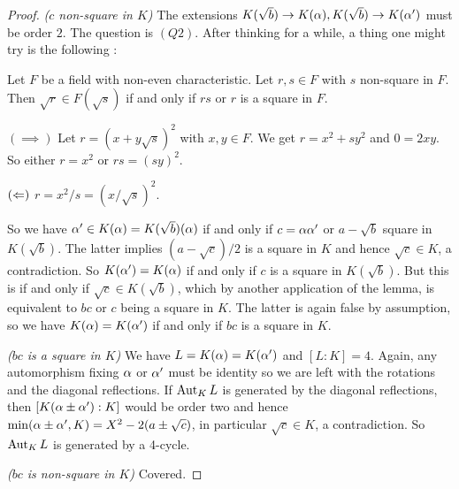 \documentclass{article}
\begin{document}
\begin{proof}
  \textit{($c$ non-square in $K$)}
  The extensions $K(\sqrt{b}) \to K(\alpha), K(\sqrt{b}) \to K(\alpha')$ must 
  be order $2$.
  The question is $(Q2)$.
  After thinking for a while, 
  a thing one might try is the following : 
  \begin{lem}
    Let $F$ be a field with non-even characteristic.
    Let $r,s \in F$ with $s$ non-square in $F$.
    Then $\sqrt{r} \in F(\sqrt{s})$ if and only if 
    $rs$ or $r$ is a square in $F$.
    \begin{proof1}
      $(\implies)$
      Let $r = (x + y\sqrt{s})^2$ with $x,y \in F$.
      We get $r = x^2 + sy^2$ and $0 = 2 xy$. 
      So either $r = x^2$ or $rs = (s y)^2$.

      $(\Leftarrow)$
      $r = x^2 / s = (x / \sqrt{s})^2$. 
    \end{proof1}
  \end{lem}
  So we have $\alpha' \in K(\alpha) = K(\sqrt{b})(\alpha)$ if and only if 
  $c = \alpha \alpha'$ or $a - \sqrt{b}$ square in $K(\sqrt{b})$.
  The latter implies $(a - \sqrt{c})/2$ is a square in $K$
  and hence $\sqrt{c} \in K$, a contradiction.
  So $K(\alpha') = K(\alpha)$ if and only if $c$ is a square in $K(\sqrt{b})$.
  But this is if and only if $\sqrt{c} \in K(\sqrt{b})$,
  which by another application of the lemma,
  is equivalent to $bc$ or $c$ being a square in $K$.
  The latter is again false by assumption,
  so we have $K(\alpha) = K(\alpha')$ if and only if $bc$ is a square in $K$.

  \textit{($bc$ is a square in $K$)}
  We have $L = K(\alpha) = K(\alpha')$ and $[L : K] = 4$.
  Again, any automorphism fixing $\alpha$ or $\alpha'$ must be identity 
  so we are left with the rotations and the diagonal reflections.
  If $\operatorname{Aut}_K L$ is generated by the diagonal reflections,
  then $[K(\alpha \pm \alpha') : K]$ would be order two and hence 
  $\min(\alpha\pm\alpha',K) = X^2 - 2(a \pm \sqrt{c})$,
  in particular $\sqrt{c} \in K$, a contradiction. 
  So $\operatorname{Aut}_K L$ is generated by a 4-cycle.

  \textit{($bc$ is non-square in $K$)} Covered.
\end{proof}

\end{document}
